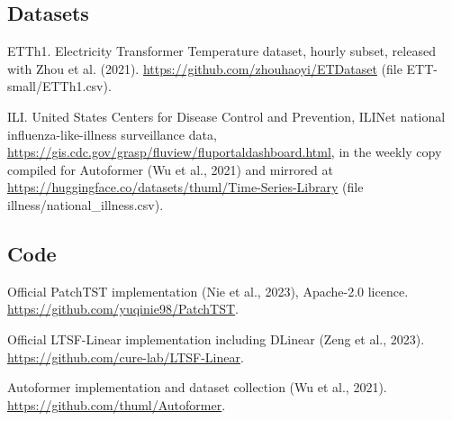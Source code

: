 \documentclass[11pt,letterpaper]{article}
\begin{document}
\subsection*{Datasets}
\begin{list}{}{\setlength{\leftmargin}{1.5em}\setlength{\itemindent}{-1.5em}\setlength{\itemsep}{2pt}\setlength{\parsep}{0pt}}\small
\item ETTh1. Electricity Transformer Temperature dataset, hourly subset, released with Zhou et al. (2021). \url{https://github.com/zhouhaoyi/ETDataset} (file ETT-small/ETTh1.csv).
\item ILI. United States Centers for Disease Control and Prevention, ILINet national influenza-like-illness surveillance data, \url{https://gis.cdc.gov/grasp/fluview/fluportaldashboard.html}, in the weekly copy compiled for Autoformer (Wu et al., 2021) and mirrored at \url{https://huggingface.co/datasets/thuml/Time-Series-Library} (file illness/national\_illness.csv).
\end{list}

\subsection*{Code}
\begin{list}{}{\setlength{\leftmargin}{1.5em}\setlength{\itemindent}{-1.5em}\setlength{\itemsep}{2pt}\setlength{\parsep}{0pt}}\small
\item Official PatchTST implementation (Nie et al., 2023), Apache-2.0 licence. \url{https://github.com/yuqinie98/PatchTST}.
\item Official LTSF-Linear implementation including DLinear (Zeng et al., 2023). \url{https://github.com/cure-lab/LTSF-Linear}.
\item Autoformer implementation and dataset collection (Wu et al., 2021). \url{https://github.com/thuml/Autoformer}.
\end{list}

\clearpage
\appendix
\setcounter{table}{0}
\renewcommand{\thetable}{A\arabic{table}}
\end{document}
